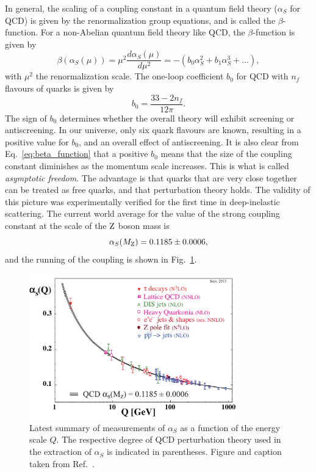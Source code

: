 In general, the scaling of a coupling constant in a quantum field theory ($\alpha_S$ for QCD) is
given by the renormalization group equations, and is called the $\beta$-function. For a non-Abelian
quantum field theory like QCD, the $\beta$-function is given by
\begin{equation}
\beta(\alpha_S(\mu)) = \mu^2 \frac{d\alpha_S(\mu)}{d\mu^2} = - (b_0 \alpha_S^2 +  b_1 \alpha_S^3 +
\ldots), 
\label{eq:beta_function}
\end{equation}
with $\mu^2$ the renormalization scale. The one-loop coefficient $b_0$ for QCD with $n_f$ flavours
of quarks is given by
\begin{equation}
  b_0 = \frac{33 - 2n_f}{12\pi}.
\end{equation}
The sign of $b_0$ determines whether the overall theory will exhibit screening or antiscreening. In
our universe, only six quark flavours are known, resulting in a positive value for $b_0$, and an
overall effect of antiscreening. 
It is also clear from Eq.~\ref{eq:beta_function} that a positive $b_0$ means that the size of the
coupling constant diminishes as the momentum scale increases. This is what is called
\textit{asymptotic freedom}. The advantage is that quarks that are very close together can be
treated as free quarks, and that perturbation theory holds. The validity of this picture was
experimentally verified for the first time in deep-inelastic scattering. 
The current world average for the value of the strong coupling constant at the scale of the $\mathrm{Z}$
boson mass is
\begin{equation}
  \alpha_S(M_{\mathrm{Z}}) = 0.1185 \pm 0.0006, 
\end{equation}
and the running of the coupling is shown in Fig.~\ref{fig:running_coupling}. 

\begin{figure}[htpb]
  \centering
  \includegraphics[width=0.8\textwidth]{figures/standardmodel/asq-2013}
  \caption{Latest summary of measurements of $\alpha_S$ as a function of the energy scale $Q$.
The respective degree of QCD perturbation theory used in the extraction of $\alpha_S$ is
indicated in parentheses. Figure and caption taken from Ref.~\cite{Agashe:2014kda}.
  \label{fig:running_coupling}}
\end{figure}

